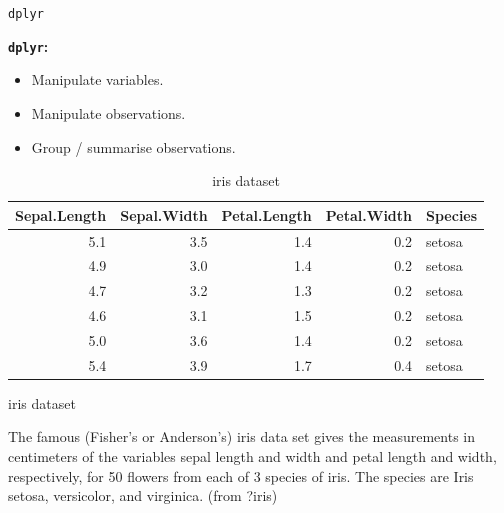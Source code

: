 \documentclass[14pt,ignorenonframetext,]{bredelebeamer}
\providecommand{\tightlist}{%
  \setlength{\itemsep}{0pt}\setlength{\parskip}{0pt}}
\begin{document}
\begin{frame}[fragile]{\texttt{dplyr}}

\textbf{\texttt{dplyr}:}

\begin{itemize}
\tightlist
\item
  Manipulate variables.
\item
  Manipulate observations.
\item
  Group / summarise observations.
\end{itemize}

\begin{center}
\begin{table}[t]

\caption{\label{tab:unnamed-chunk-23}iris dataset}
\centering
\begin{tabular}{r|r|r|r|l}
\hline
Sepal.Length & Sepal.Width & Petal.Length & Petal.Width & Species\\
\hline
5.1 & 3.5 & 1.4 & 0.2 & setosa\\
\hline
4.9 & 3.0 & 1.4 & 0.2 & setosa\\
\hline
4.7 & 3.2 & 1.3 & 0.2 & setosa\\
\hline
4.6 & 3.1 & 1.5 & 0.2 & setosa\\
\hline
5.0 & 3.6 & 1.4 & 0.2 & setosa\\
\hline
5.4 & 3.9 & 1.7 & 0.4 & setosa\\
\hline
\end{tabular}
\end{table}
\end{center}

\begin{block}{iris dataset}

The famous (Fisher's or Anderson's) iris data set gives the measurements
in centimeters of the variables sepal length and width and petal length
and width, respectively, for 50 flowers from each of 3 species of iris.
The species are Iris setosa, versicolor, and virginica. (from ?iris)

\end{block}

\end{frame}
\end{document}

